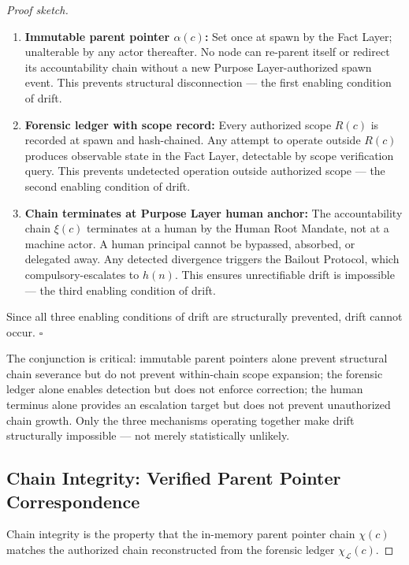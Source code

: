 \begin{proof}[Proof sketch]
\begin{enumerate}
    \item[(i)] \textbf{Immutable parent pointer $\alpha(c)$:} Set once at spawn by the Fact Layer; unalterable by any actor thereafter. No node can re-parent itself or redirect its accountability chain without a new Purpose Layer-authorized spawn event. This prevents structural disconnection — the first enabling condition of drift.
    \item[(ii)] \textbf{Forensic ledger with scope record:} Every authorized scope $R(c)$ is recorded at spawn and hash-chained. Any attempt to operate outside $R(c)$ produces observable state in the Fact Layer, detectable by scope verification query. This prevents undetected operation outside authorized scope — the second enabling condition of drift.
    \item[(iii)] \textbf{Chain terminates at Purpose Layer human anchor:} The accountability chain $\xi(c)$ terminates at a human by the Human Root Mandate, not at a machine actor. A human principal cannot be bypassed, absorbed, or delegated away. Any detected divergence triggers the Bailout Protocol, which compulsory-escalates to $h(n)$. This ensures unrectifiable drift is impossible — the third enabling condition of drift.
\end{enumerate}

Since all three enabling conditions of drift are structurally prevented, drift cannot occur. $\square$
\endproof

The conjunction is critical: immutable parent pointers alone prevent structural chain severance but do not prevent within-chain scope expansion; the forensic ledger alone enables detection but does not enforce correction; the human terminus alone provides an escalation target but does not prevent unauthorized chain growth. Only the three mechanisms operating together make drift structurally impossible — not merely statistically unlikely.

\subsection{Chain Integrity: Verified Parent Pointer Correspondence}
\label{sec:rs-chain-integrity}

Chain integrity is the property that the in-memory parent pointer chain $\chi(c)$ matches the authorized chain reconstructed from the forensic ledger $\chi_{\mathcal{L}}(c)$.


\end{proof}

